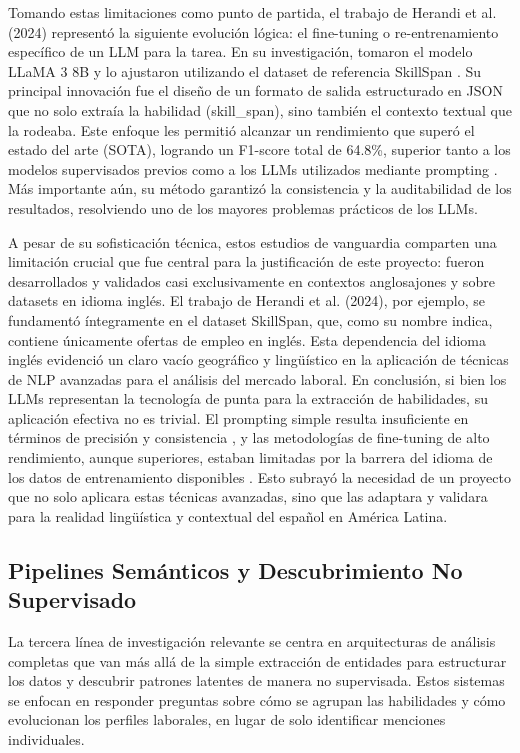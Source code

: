 Tomando estas limitaciones como punto de partida, el trabajo de Herandi et al. (2024) representó la siguiente evolución lógica: el fine-tuning o re-entrenamiento específico de un LLM para la tarea. En su investigación, tomaron el modelo LLaMA 3 8B y lo ajustaron utilizando el dataset de referencia SkillSpan \cite{herandi2024}. Su principal innovación fue el diseño de un formato de salida estructurado en JSON que no solo extraía la habilidad (skill\_span), sino también el contexto textual que la rodeaba. Este enfoque les permitió alcanzar un rendimiento que superó el estado del arte (SOTA), logrando un F1-score total de 64.8\%, superior tanto a los modelos supervisados previos como a los LLMs utilizados mediante prompting \cite{herandi2024}. Más importante aún, su método garantizó la consistencia y la auditabilidad de los resultados, resolviendo uno de los mayores problemas prácticos de los LLMs.

A pesar de su sofisticación técnica, estos estudios de vanguardia comparten una limitación crucial que fue central para la justificación de este proyecto: fueron desarrollados y validados casi exclusivamente en contextos anglosajones y sobre datasets en idioma inglés. El trabajo de Herandi et al. (2024), por ejemplo, se fundamentó íntegramente en el dataset SkillSpan, que, como su nombre indica, contiene únicamente ofertas de empleo en inglés. Esta dependencia del idioma inglés evidenció un claro vacío geográfico y lingüístico en la aplicación de técnicas de NLP avanzadas para el análisis del mercado laboral. En conclusión, si bien los LLMs representan la tecnología de punta para la extracción de habilidades, su aplicación efectiva no es trivial. El prompting simple resulta insuficiente en términos de precisión y consistencia \cite{nguyen2024}, y las metodologías de fine-tuning de alto rendimiento, aunque superiores, estaban limitadas por la barrera del idioma de los datos de entrenamiento disponibles \cite{herandi2024}. Esto subrayó la necesidad de un proyecto que no solo aplicara estas técnicas avanzadas, sino que las adaptara y validara para la realidad lingüística y contextual del español en América Latina.

\subsection{Pipelines Semánticos y Descubrimiento No Supervisado}

La tercera línea de investigación relevante se centra en arquitecturas de análisis completas que van más allá de la simple extracción de entidades para estructurar los datos y descubrir patrones latentes de manera no supervisada. Estos sistemas se enfocan en responder preguntas sobre cómo se agrupan las habilidades y cómo evolucionan los perfiles laborales, en lugar de solo identificar menciones individuales.

